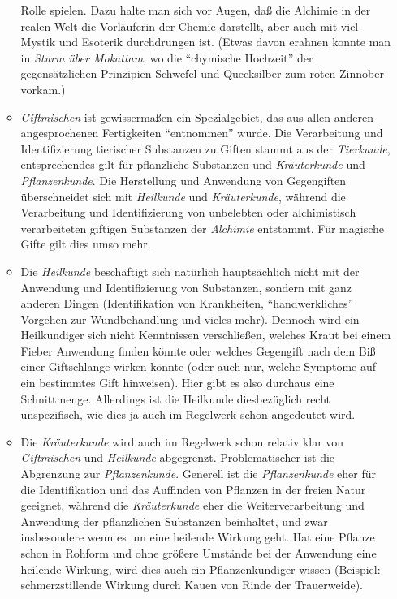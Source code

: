 \documentclass[10pt,a4paper,germanpar]{article}
\begin{document}
\begin{itemize}
\begin{itemize}
    Rolle spielen. Dazu halte man sich vor Augen, daß die Alchimie in der
    realen Welt die Vorläuferin der Chemie darstellt, aber auch mit viel
    Mystik und Esoterik durchdrungen ist. (Etwas davon erahnen konnte man in
    \emph{Sturm über Mokattam}, wo die "`chymische Hochzeit"' der
    gegensätzlichen Prinzipien Schwefel und Quecksilber zum roten Zinnober
    vorkam.)
  \item \emph{Giftmischen} ist gewissermaßen ein Spezialgebiet, das aus allen
    anderen angesprochenen Fertigkeiten "`entnommen"' wurde. Die Verarbeitung
    und Identifizierung tierischer Substanzen zu Giften stammt aus der
    \emph{Tierkunde}, entsprechendes gilt für pflanzliche Substanzen und
    \emph{Kräuterkunde} und \emph{Pflanzenkunde}. Die Herstellung und
    Anwendung von Gegengiften überschneidet sich mit \emph{Heilkunde}
    und \emph{Kräuterkunde}, während die Verarbeitung und Identifizierung von
    unbelebten oder alchimistisch verarbeiteten giftigen Substanzen der
    \emph{Alchimie} entstammt. Für magische Gifte gilt dies umso mehr.
  \item Die \emph{Heilkunde} beschäftigt sich natürlich hauptsächlich nicht
    mit der Anwendung und Identifizierung von Substanzen, sondern mit ganz
    anderen Dingen (Identifikation von Krankheiten, "`handwerkliches"'
    Vorgehen zur Wundbehandlung und vieles mehr). Dennoch wird ein
    Heilkundiger sich nicht Kenntnissen verschließen, welches Kraut bei einem
    Fieber Anwendung finden könnte oder welches Gegengift nach dem Biß einer
    Giftschlange wirken könnte (oder auch nur, welche Symptome auf ein
    bestimmtes Gift hinweisen). Hier gibt es also durchaus eine Schnittmenge.
    Allerdings ist die Heilkunde diesbezüglich recht unspezifisch, wie dies ja
    auch im Regelwerk schon angedeutet wird.
  \item Die \emph{Kräuterkunde} wird auch im Regelwerk schon relativ klar von
    \emph{Giftmischen} und \emph{Heilkunde} abgegrenzt. Problematischer ist
    die Abgrenzung zur \emph{Pflanzenkunde}. Generell ist die
    \emph{Pflanzenkunde} eher für die Identifikation und das Auffinden von
    Pflanzen in der freien Natur geeignet, während die \emph{Kräuterkunde}
    eher die Weiterverarbeitung und Anwendung der pflanzlichen
    Substanzen beinhaltet, und zwar insbesondere wenn es um eine heilende
    Wirkung geht. Hat eine Pflanze schon in Rohform und ohne größere Umstände
    bei der Anwendung eine heilende Wirkung, wird dies auch ein
    Pflanzenkundiger wissen (Beispiel: schmerzstillende Wirkung durch Kauen
    von Rinde der Trauerweide).

\end{itemize}
\end{itemize}
\end{document}

